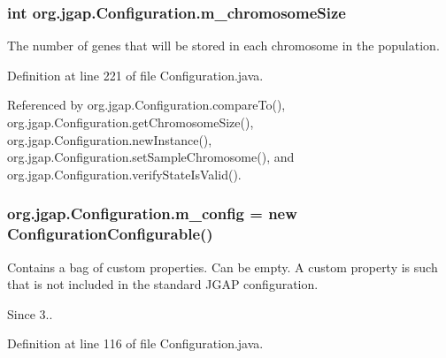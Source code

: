 \hypertarget{classorg_1_1jgap_1_1_configuration_a21b467964361e74f6dcf74a27e2585eb}{
\subsubsection[{m\-\_\-chromosome\-Size}]{\setlength{\rightskip}{0pt plus 5cm}int org.\-jgap.\-Configuration.\-m\-\_\-chromosome\-Size\hspace{0.3cm}{\ttfamily [private]}}}\label{classorg_1_1jgap_1_1_configuration_a21b467964361e74f6dcf74a27e2585eb}
The number of genes that will be stored in each chromosome in the population. 

Definition at line 221 of file Configuration.\-java.



Referenced by org.\-jgap.\-Configuration.\-compare\-To(), org.\-jgap.\-Configuration.\-get\-Chromosome\-Size(), org.\-jgap.\-Configuration.\-new\-Instance(), org.\-jgap.\-Configuration.\-set\-Sample\-Chromosome(), and org.\-jgap.\-Configuration.\-verify\-State\-Is\-Valid().

\hypertarget{classorg_1_1jgap_1_1_configuration_a500818f896d3eb752a306d377d1c6652}{
\subsubsection[{m\-\_\-config}]{ org.\-jgap.\-Configuration.\-m\-\_\-config = new {\bf Configuration\-Configurable}()\hspace{0.3cm}{\ttfamily [private]}}}\label{classorg_1_1jgap_1_1_configuration_a500818f896d3eb752a306d377d1c6652}
Contains a bag of custom properties. Can be empty. A custom property is such that is not included in the standard J\-G\-A\-P configuration.

\begin{DoxySince}{Since}
3.. 
\end{DoxySince}


Definition at line 116 of file Configuration.\-java.



